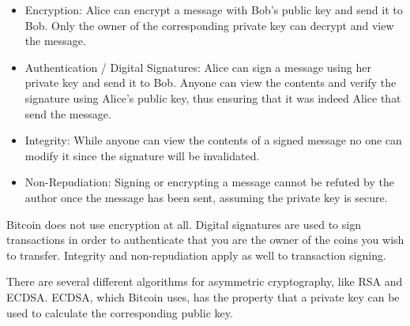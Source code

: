 \begin{itemize}
\item Encryption: Alice can encrypt a message with Bob’s public key and send it to Bob. Only the owner of the corresponding private key can decrypt and view the message.
\item Authentication / Digital Signatures: Alice can sign a message using her private key and send it to Bob. Anyone can view the contents and verify the signature using Alice’s public key, thus ensuring that it was indeed Alice that send the message.
\item Integrity: While anyone can view the contents of a signed message no one can modify it since the signature will be invalidated.
\item Non-Repudiation: Signing or encrypting a message cannot be refuted by the author once the message has been sent, assuming the private key is secure.
\end{itemize}


\begin{note}
Bitcoin does not use encryption at all. Digital signatures are used to sign transactions in order to authenticate that you are the owner of the coins you wish to transfer. Integrity and non-repudiation apply as well to transaction signing.
\end{note}

There are several different algorithms for asymmetric cryptography, like RSA and ECDSA. ECDSA, which Bitcoin uses, has the property that a private key can be used to calculate the corresponding public key.


